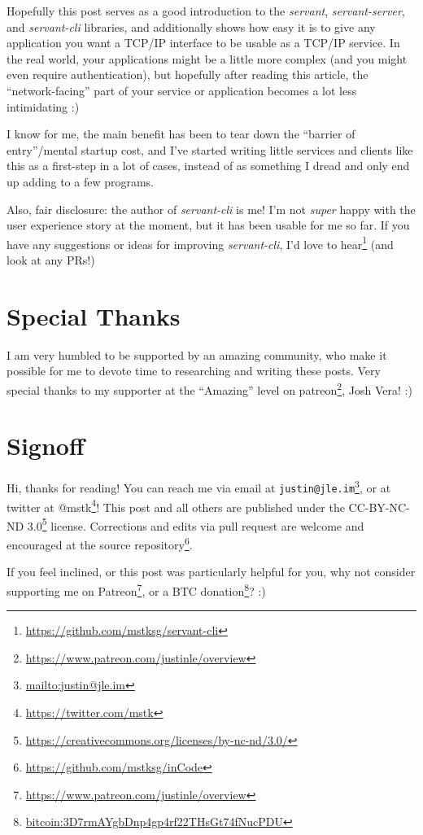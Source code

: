 \documentclass[]{article}
\renewcommand{\href}[2]{#2\footnote{\url{#1}}}
\begin{document}
Hopefully this post serves as a good introduction to the \emph{servant},
\emph{servant-server}, and \emph{servant-cli} libraries, and additionally shows
how easy it is to give any application you want a TCP/IP interface to be usable
as a TCP/IP service. In the real world, your applications might be a little more
complex (and you might even require authentication), but hopefully after reading
this article, the ``network-facing'' part of your service or application becomes
a lot less intimidating :)

I know for me, the main benefit has been to tear down the ``barrier of
entry''/mental startup cost, and I've started writing little services and
clients like this as a first-step in a lot of cases, instead of as something I
dread and only end up adding to a few programs.

Also, fair disclosure: the author of \emph{servant-cli} is me! I'm not
\emph{super} happy with the user experience story at the moment, but it has been
usable for me so far. If you have any suggestions or ideas for improving
\emph{servant-cli}, I'd \href{https://github.com/mstksg/servant-cli}{love to
hear} (and look at any PRs!)

\hypertarget{special-thanks}{%
\section{Special Thanks}\label{special-thanks}}

I am very humbled to be supported by an amazing community, who make it possible
for me to devote time to researching and writing these posts. Very special
thanks to my supporter at the ``Amazing'' level on
\href{https://www.patreon.com/justinle/overview}{patreon}, Josh Vera! :)

\hypertarget{signoff}{%
\section{Signoff}\label{signoff}}

Hi, thanks for reading! You can reach me via email at
\href{mailto:justin@jle.im}{\nolinkurl{justin@jle.im}}, or at twitter at
\href{https://twitter.com/mstk}{@mstk}! This post and all others are published
under the \href{https://creativecommons.org/licenses/by-nc-nd/3.0/}{CC-BY-NC-ND
3.0} license. Corrections and edits via pull request are welcome and encouraged
at \href{https://github.com/mstksg/inCode}{the source repository}.

If you feel inclined, or this post was particularly helpful for you, why not
consider \href{https://www.patreon.com/justinle/overview}{supporting me on
Patreon}, or a \href{bitcoin:3D7rmAYgbDnp4gp4rf22THsGt74fNucPDU}{BTC donation}?
:)
\end{document}

